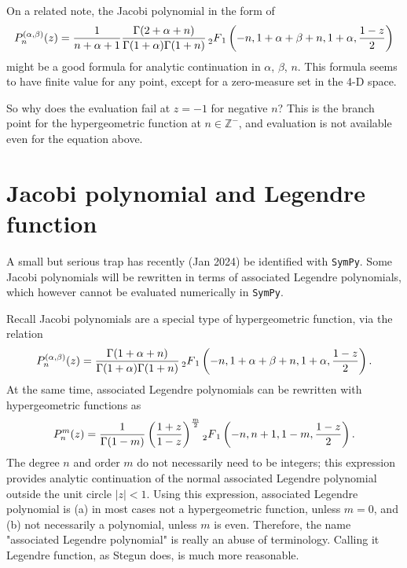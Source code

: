 On a related note, the Jacobi polynomial in the form of
\begin{equation}
    P_n^{(\alpha,\beta)}(z) = \frac{1}{n + \alpha + 1} \frac{\Gamma(2 + \alpha + n)}{\Gamma(1 + \alpha) \Gamma(1 + n)} \prescript{}{2}{F}_1\left(-n, 1+\alpha+\beta+n, 1+\alpha, \frac{1-z}{2}\right)
\end{equation}
might be a good formula for analytic continuation in $\alpha$, $\beta$, $n$. This formula seems to have finite value for any point, except for a zero-measure set in the 4-D space.

So why does the evaluation fail at $z=-1$ for negative $n$? This is the branch point for the hypergeometric function at $n\in \mathbb{Z}^-$, and evaluation is not available even for the equation above.


\section{Jacobi polynomial and Legendre function}

A small but serious trap has recently (Jan 2024) be identified with \texttt{SymPy}. Some Jacobi polynomials will be rewritten in terms of associated Legendre polynomials, which however cannot be evaluated numerically in \texttt{SymPy}.

Recall Jacobi polynomials are a special type of hypergeometric function, via the relation
\[
    P_n^{(\alpha,\beta)}(z) = \frac{\Gamma(1 + \alpha + n)}{\Gamma(1 + \alpha) \Gamma(1 + n)} \prescript{}{2}{F}_1\left(-n, 1+\alpha+\beta+n, 1+\alpha, \frac{1-z}{2}\right).
\]
At the same time, associated Legendre polynomials can be rewritten with hypergeometric functions as 
\[
    P_n^m(z) = \frac{1}{\Gamma(1 - m)}\left(\frac{1 + z}{1 - z}\right)^{\frac{m}{2}} \prescript{}{2}{F}_1 \left(-n, n+1, 1 - m, \frac{1-z}{2}\right).
\]
The degree $n$ and order $m$ do not necessarily need to be integers; this expression provides analytic continuation of the normal associated Legendre polynomial outside the unit circle $|z|<1$.
Using this expression, associated Legendre polynomial is (a) in most cases not a hypergeometric function, unless $m=0$, and (b) not necessarily a polynomial, unless $m$ is even.
Therefore, the name "associated Legendre polynomial" is really an abuse of terminology. Calling it Legendre function, as Stegun does, is much more reasonable.

